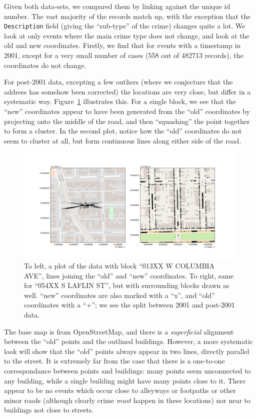 \documentclass[twoside,a4paper,twocolumn,10pt]{article}
\theoremstyle{plain}
\theoremstyle{definition}
\begin{document}
Given both data-sets, we compared them by linking against the unique id number.  The vast majority
of the records match up, with the exception that the \texttt{Description} field (giving the
``sub-type'' of the crime) changes quite a lot.  We look at only events where the main crime
type does not change, and look at the old and new coordinates.  Firstly, we find that for
events with a timestamp in 2001, except for a very small number of cases
(558 out of 482713 records), the coordinates do not change.

For post-2001 data, excepting a few outliers
(where we conjecture that the address has somehow been corrected) the locations are very close,
but differ in a systematic way.  Figure~\ref{fig:three} illustrates this.  For a single block,
we see that the ``new'' coordinates appear to have been generated from the ``old'' coordinates
by projecting onto the middle of the road, and then ``squashing'' the point together to form
a cluster.  In the second plot, notice how the ``old'' coordinates do not seem to cluster at
all, but form continuous lines along either side of the road.

\begin{figure}
  \includegraphics[width=\textwidth]{Chicago_example1.png}
  \caption{To left, a plot of the data with block ``013XX W COLUMBIA AVE'', lines joining the
``old'' and ``new'' coordinates.  To right, same for ``054XX S LAFLIN ST'', but with surrounding
blocks drawn as well.  ``new'' coordinates are also marked with a ``x'', and ``old'' coordinates
with a ``+''; we see the split between 2001 and post-2001 data.}
  \label{fig:three}
\end{figure}

The base map is from OpenStreetMap, and there is a \emph{superficial} alignment between the
``old'' points and the outlined buildings.  However, a more systematic look will show that the
``old'' points always appear in two lines, directly parallel to the street.  It is extremely
far from the case that there is a one-to-one correspondance between points and buildings:
many points seem unconnected to any building, while a single building might have many points
close to it.  There appear to be no events which occur close to alleyways or footpaths or other
minor roads (although clearly crime \emph{must} happen in these locations) nor near to
buildings not close to streets.
\end{document}
